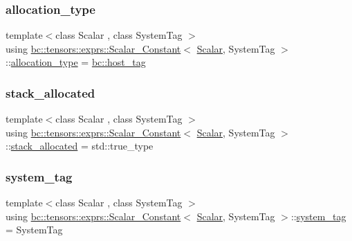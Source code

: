 \subsubsection{\texorpdfstring{allocation\+\_\+type}{allocation\_type}}
{\footnotesize\ttfamily template$<$class Scalar , class System\+Tag $>$ \\
using \hyperlink{structbc_1_1tensors_1_1exprs_1_1Scalar__Constant}{bc\+::tensors\+::exprs\+::\+Scalar\+\_\+\+Constant}$<$ \hyperlink{namespacebc_aa12ac55ee2c43dc082894dd3859daee1}{Scalar}, System\+Tag $>$\+::\hyperlink{structbc_1_1tensors_1_1exprs_1_1Scalar__Constant_a9e3e003a807bb461f0120f993e2d36e5}{allocation\+\_\+type} =  \hyperlink{structbc_1_1host__tag}{bc\+::host\+\_\+tag}}

\mbox{\label{structbc_1_1tensors_1_1exprs_1_1Scalar__Constant_a33561cf2b74145fe0d832fab9b624921}} 
\subsubsection{\texorpdfstring{stack\+\_\+allocated}{stack\_allocated}}
{\footnotesize\ttfamily template$<$class Scalar , class System\+Tag $>$ \\
using \hyperlink{structbc_1_1tensors_1_1exprs_1_1Scalar__Constant}{bc\+::tensors\+::exprs\+::\+Scalar\+\_\+\+Constant}$<$ \hyperlink{namespacebc_aa12ac55ee2c43dc082894dd3859daee1}{Scalar}, System\+Tag $>$\+::\hyperlink{structbc_1_1tensors_1_1exprs_1_1Scalar__Constant_a33561cf2b74145fe0d832fab9b624921}{stack\+\_\+allocated} =  std\+::true\+\_\+type}

\mbox{\label{structbc_1_1tensors_1_1exprs_1_1Scalar__Constant_a06478729344f3ef5709f7a44075d76ba}} 
\subsubsection{\texorpdfstring{system\+\_\+tag}{system\_tag}}
{\footnotesize\ttfamily template$<$class Scalar , class System\+Tag $>$ \\
using \hyperlink{structbc_1_1tensors_1_1exprs_1_1Scalar__Constant}{bc\+::tensors\+::exprs\+::\+Scalar\+\_\+\+Constant}$<$ \hyperlink{namespacebc_aa12ac55ee2c43dc082894dd3859daee1}{Scalar}, System\+Tag $>$\+::\hyperlink{structbc_1_1tensors_1_1exprs_1_1Scalar__Constant_a06478729344f3ef5709f7a44075d76ba}{system\+\_\+tag} =  System\+Tag}

